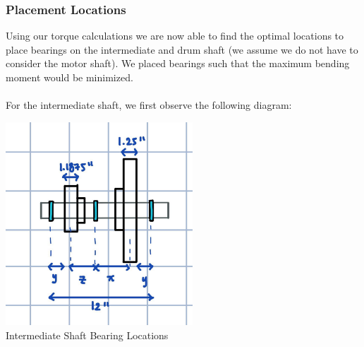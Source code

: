\documentclass[letterpaper,12pt]{article}
\begin{document}
\subsubsection{Placement Locations}
Using our torque calculations we are now able to find the optimal locations to place bearings on the intermediate and drum shaft (we assume we do not have to consider the motor shaft). We placed bearings such that the maximum bending moment would be minimized.\\\\
For the intermediate shaft, we first observe the following diagram:
\begin{center}
\includegraphics[width=7cm]{MECH325AIdler.jpg} \\
Intermediate Shaft Bearing Locations
\end{center}
\end{document}
